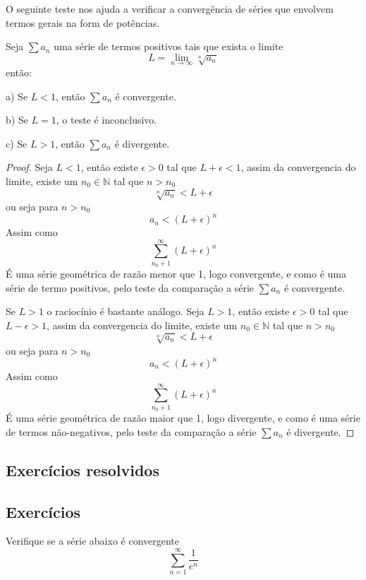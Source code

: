 O seguinte teste nos ajuda a verificar a convergência de séries que envolvem
termos gerais na form de potências.

\begin{teo}
    Seja $\sum a_n$ uma série de termos positivos tais que exista o limite
    $$L = \lim_{n \to \infty} \sqrt[n]{a_n} $$
    então:
    \item [a)] Se $L < 1$, então $\sum a_n$ é convergente.
    \item [b)] Se $L = 1$, o teste é inconclusivo.
    \item [c)] Se $L > 1$, então $\sum a_n$ é divergente.
\end{teo}

\begin{proof}
    Seja $L<1$, então existe $\epsilon > 0$ tal que $L + \epsilon < 1$, assim
    da convergencia do limite, existe um $n_0 \in \mathbb{N}$ tal que $n>n_0$
    $$ \sqrt[n]{a_n} < L + \epsilon$$
    ou seja para $n>n_0$
    $$ a_n < (L + \epsilon)^{n}$$    
    Assim como 
    $$\sum_{n_0+1}^{\infty} (L + \epsilon)^{n} $$
    É uma série geométrica de razão menor que 1, logo convergente, e como
    é uma série de termo positivos, pelo teste da comparação a série $\sum a_n$
    é convergente.

    Se $L>1$ o raciocínio é bastante análogo. Seja $L>1$, então existe $\epsilon > 0$
    tal que $L - \epsilon > 1$, assim da convergencia do limite, existe um 
    $n_0 \in \mathbb{N}$ tal que $n>n_0$
    $$ \sqrt[n]{a_n} < L + \epsilon$$
    ou seja para $n>n_0$
    $$ a_n < (L + \epsilon)^{n}$$    
    Assim como 
    $$\sum_{n_0+1}^{\infty} (L + \epsilon)^{n} $$   
    É uma série geométrica de razão maior que 1, logo divergente, e como
    é uma série de termos não-negativos, pelo teste da comparação a série $\sum a_n$
    é divergente.

\end{proof}

\subsection*{Exercícios resolvidos}

\construirExeresol


\subsection*{Exercícios}

\construirExer

\begin{exer}
    Verifique se a série abaixo é convergente 
    $$\sum_{n =1}^{\infty} \frac{1}{e^n}$$
\end{exer}

